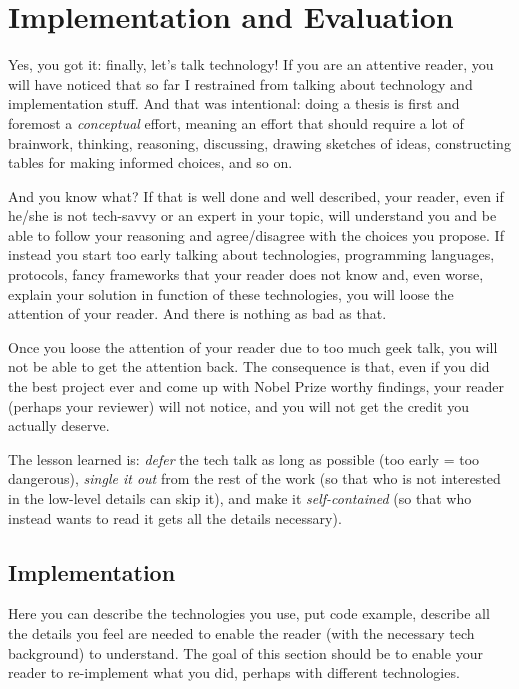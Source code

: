 \chapter{Implementation and Evaluation}
\label{capitolo5}
\thispagestyle{empty}

Yes, you got it: finally, let's talk technology! If you are an attentive reader, you will have noticed that so far I restrained from talking about technology and implementation stuff. And that was intentional: doing a thesis is first and foremost a \emph{conceptual} effort, meaning an effort that should require a lot of brainwork, thinking, reasoning, discussing, drawing sketches of ideas, constructing tables for making informed choices, and so on. 

And you know what? If that is well done and well described, your reader, even if he/she is not tech-savvy or an expert in your topic, will understand you and be able to follow your reasoning and agree/disagree with the choices you propose. If instead you start too early talking about technologies, programming languages, protocols, fancy frameworks that your reader does not know and, even worse, explain your solution in function of these technologies, you will loose the attention of your reader. And there is nothing as bad as that. 

Once you loose the attention of your reader due to too much geek talk, you will not be able to get the attention back. The consequence is that, even if you did the best project ever and come up with Nobel Prize worthy findings, your reader (perhaps your reviewer) will not notice, and you will not get the credit you actually deserve. 

The lesson learned is: \emph{defer} the tech talk as long as possible (too early = too dangerous), \emph{single it out} from the rest of the work (so that who is not interested in the low-level details can skip it), and make it \emph{self-contained} (so that who instead wants to read it gets all the details necessary).


\section{Implementation}
Here you can describe the technologies you use, put code example, describe all the details you feel are needed to enable the reader (with the necessary tech background) to understand. The goal of this section should be to enable your reader to re-implement what you did, perhaps with different technologies. 

